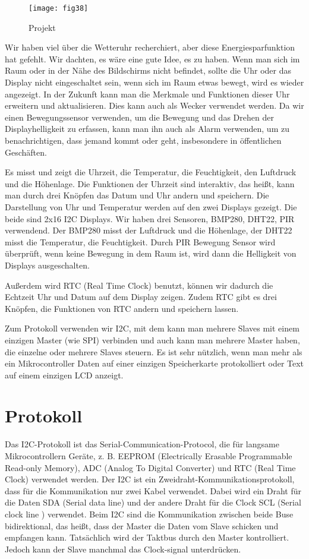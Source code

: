 \documentclass[conference]{IEEEtran}
\begin{document}
\begin{figure}[h]
	\centering
	\texttt{[image: fig38]}
	\caption{Projekt}
	\label{fig:fig38}
\end{figure}
   
Wir haben viel über die Wetteruhr recherchiert, aber diese Energiesparfunktion hat gefehlt. Wir dachten, es wäre eine gute Idee, es zu haben. Wenn man sich im Raum oder in der Nähe des Bildschirms nicht befindet, sollte die Uhr oder das Display nicht eingeschaltet sein, wenn sich im Raum etwas bewegt, wird es wieder angezeigt. In der Zukunft kann man die Merkmale und Funktionen dieser Uhr erweitern und aktualisieren. Dies kann auch als Wecker verwendet werden. Da wir einen Bewegungssensor verwenden, um die Bewegung 
und das Drehen der Displayhelligkeit zu erfassen, kann man ihn auch als Alarm verwenden, um zu benachrichtigen, dass jemand kommt oder geht, insbesondere in öffentlichen Geschäften.

Es misst und zeigt die Uhrzeit, die Temperatur, die Feuchtigkeit, den Luftdruck und die Höhenlage. Die Funktionen der Uhrzeit sind interaktiv, das heißt, kann man durch drei Knöpfen das Datum und Uhr andern und speichern. Die Darstellung von Uhr und Temperatur werden auf den zwei Displays gezeigt. Die beide sind 2x16 I2C Displays. 
Wir haben drei Sensoren, BMP280, DHT22, PIR verwendend. Der BMP280 misst der Luftdruck und die Höhenlage, der DHT22 misst die Temperatur, die Feuchtigkeit. Durch PIR Bewegung Sensor wird überprüft, wenn keine Bewegung in dem Raum ist, wird dann die Helligkeit von Displays ausgeschalten.


Außerdem wird RTC (Real Time Clock) benutzt, können wir dadurch die Echtzeit Uhr und Datum auf dem Display zeigen. Zudem RTC gibt es drei Knöpfen, die Funktionen von RTC andern und speichern lassen.  

Zum Protokoll verwenden wir I2C, mit dem kann man mehrere Slaves mit einem einzigen Master (wie SPI) verbinden und auch kann man mehrere Master haben, die einzelne oder mehrere Slaves steuern. Es ist sehr nützlich, wenn man mehr als ein Mikrocontroller Daten auf einer einzigen Speicherkarte protokolliert oder Text auf einem einzigen LCD anzeigt.

\section{Protokoll}
Das I2C-Protokoll ist das Serial-Communication-Protocol, die für langsame Mikrocontrollern Geräte, z. B. EEPROM (Electrically Erasable Programmable Read-only Memory), ADC (Analog To Digital Converter) und RTC (Real Time Clock) verwendet werden. Der I2C ist ein Zweidraht-Kommunikationsprotokoll, dass für die Kommunikation nur zwei Kabel verwendet. Dabei wird ein Draht für die Daten SDA (Serial data line) und der andere Draht für die Clock SCL (Serial clock line ) verwendet. Beim I2C sind die Kommunikation zwischen beide Buse bidirektional, das heißt, dass der Master die Daten vom Slave schicken und empfangen kann. Tatsächlich wird der Taktbus durch den Master kontrolliert. Jedoch kann der Slave manchmal das Clock-signal unterdrücken. 
\end{document}

